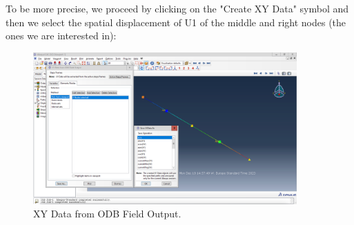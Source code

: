 To be more precise, we proceed by clicking on the "Create XY Data" symbol and then we select the spatial displacement of U1 of the middle and right nodes (the ones we are interested in):
\begin{figure}[H]
    \centering
    \includegraphics[width=0.9\textwidth]{Images/ab1/a29.png}
    \caption{XY Data from ODB Field Output.}
    \label{fig:a29}
\end{figure}

\newpage

